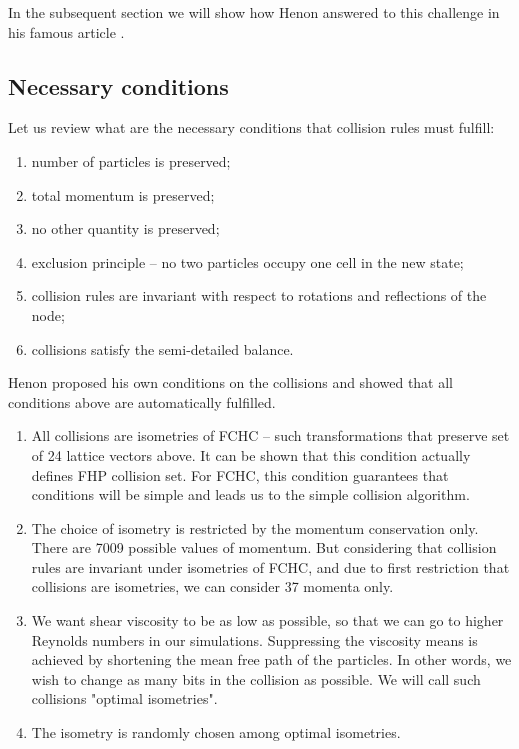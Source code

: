 In the subsequent section we will show how Henon answered to this challenge in his famous article \cite{henon}.

\bigskip

\subsection{Necessary conditions}

Let us review what are the necessary conditions that collision rules must fulfill:

\begin{enumerate}
\item number of particles is preserved;
\item total momentum is preserved;
\item no other quantity is preserved;
\item exclusion principle -- no two particles occupy one cell in the new state;
\item collision rules are invariant with respect to rotations and reflections of the node;
\item collisions satisfy the semi-detailed balance.
\end{enumerate}

Henon proposed his own conditions on the collisions and showed that all conditions above are automatically fulfilled.

\begin{enumerate}
\item All collisions are isometries of FCHC -- such transformations that preserve set of 24 lattice vectors above. It can be shown that this condition actually defines FHP collision set. For FCHC, this condition guarantees that conditions will be simple and leads us to the simple collision algorithm.

\item The choice of isometry is restricted by the momentum conservation only.
There are 7009 possible values of momentum. But considering that collision rules are invariant under isometries of FCHC, and due to first restriction that collisions are isometries, we can consider 37 momenta only.

\item We want shear viscosity to be as low as possible, so that we can go to higher Reynolds numbers in our simulations. Suppressing the viscosity means is achieved by shortening the mean free path of the particles. In other words, we wish to change as many bits in the collision as possible. We will call such collisions "optimal isometries".

\item The isometry is randomly chosen among optimal isometries.

\end{enumerate}

